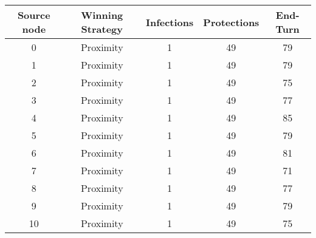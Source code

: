\documentclass[results.tex]{subfiles}
\begin{document}
    \begin{center}
        \begin{tabular}{| c || c | c | c | c |}
            \hline
            {\bfseries Source node} & {\bfseries Winning Strategy} & {\bfseries Infections} & {\bfseries Protections}
            & {\bfseries End-Turn}
            \\  %
            \hline\hline
            0                       & Proximity                    & 1                      & 49                      & 79                   \\
            \hline
            1                       & Proximity                    & 1                      & 49                      & 79                   \\
            \hline
            2                       & Proximity                    & 1                      & 49                      & 75                   \\
            \hline
            3                       & Proximity                    & 1                      & 49                      & 77                   \\
            \hline
            4                       & Proximity                    & 1                      & 49                      & 85                   \\
            \hline
            5                       & Proximity                    & 1                      & 49                      & 79                   \\
            \hline
            6                       & Proximity                    & 1                      & 49                      & 81                   \\
            \hline
            7                       & Proximity                    & 1                      & 49                      & 71                   \\
            \hline
            8                       & Proximity                    & 1                      & 49                      & 77                   \\
            \hline
            9                       & Proximity                    & 1                      & 49                      & 79                   \\
            \hline
            10                      & Proximity                    & 1                      & 49                      & 75                   \\

\end{tabular}
\end{center}
\end{document}
